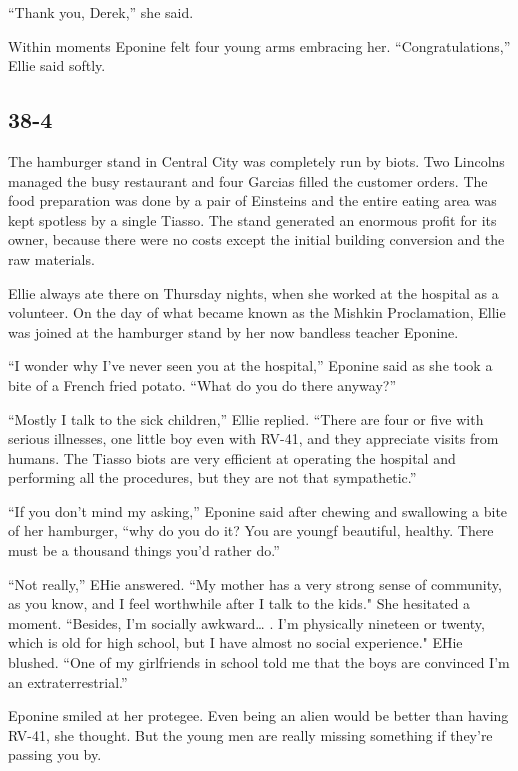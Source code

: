 \documentclass[]{article}
\begin{document}
{“Thank you, Derek,” she said.

Within moments Eponine felt four young arms embracing her.  “Congratulations,” Ellie said softly.



\subsection*{38-4}

The hamburger stand in Central City was completely run by biots.  Two Lincolns managed the busy restaurant and four Garcias filled the customer orders.  The food preparation was done by a pair of Einsteins and the entire eating area was kept spotless by a single Tiasso.  The stand generated an enormous profit for its owner, because there were no costs except the initial building conversion and the raw materials.

Ellie always ate there on Thursday nights, when she worked at the hospital as a volunteer.  On the day of what became known as the Mishkin Proclamation, Ellie was joined at the hamburger stand by her now bandless teacher Eponine.

“I wonder why I’ve never seen you at the hospital,” Eponine said as she took a bite of a French fried potato.  “What do you do there anyway?”

“Mostly I talk to the sick children,” Ellie replied.  “There are four or five with serious illnesses, one little boy even with RV-41, and they appreciate visits from humans.  The Tiasso biots are very efficient at operating the hospital and performing all the procedures, but they are not that sympathetic.”

“If you don’t mind my asking,” Eponine said after chewing and swallowing a bite of her hamburger, “why do you do it? You are youngf beautiful, healthy.  There must be a thousand things you’d rather do.”

“Not really,” EHie answered.  “My mother has a very strong sense of community, as you know, and I feel worthwhile after I talk to the kids."  She hesitated a moment.  “Besides, I’m socially awkward… .  I’m physically nineteen or twenty, which is old for high school, but I have almost no social experience."  EHie blushed.  “One of my girlfriends in school told me that the boys are convinced I’m an extraterrestrial.”

Eponine smiled at her protegee.  Even being an alien would be better than having RV-41, she thought.  But the young men are really missing something if they’re passing you by.

}
\end{document}
